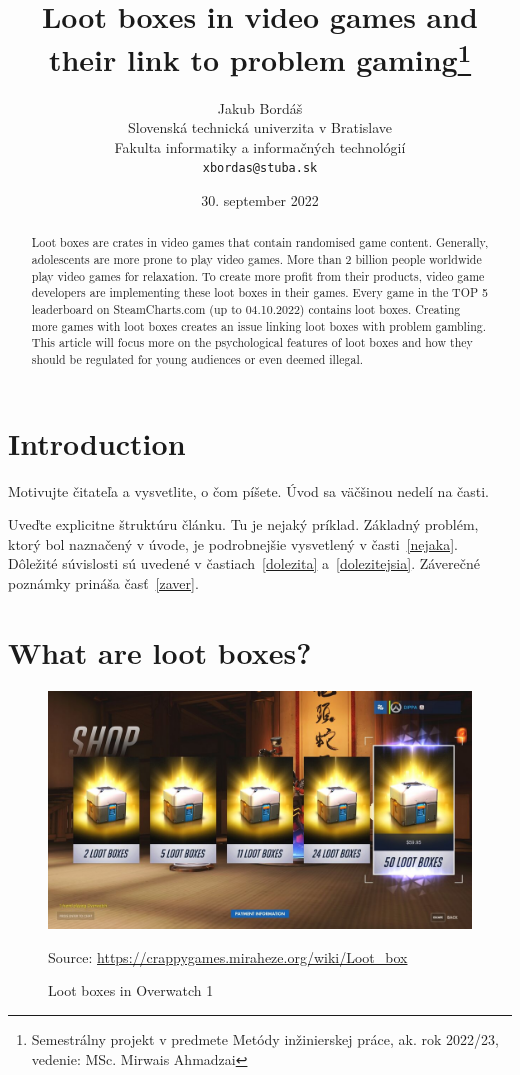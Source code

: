 \documentclass[10pt,twoside,english,a4paper]{coursepaper}
\title{Loot boxes in video games and their link to problem gaming\thanks{Semestrálny projekt v predmete Metódy inžinierskej práce, ak. rok 2022/23, vedenie: MSc. Mirwais Ahmadzai}} %
\author{Jakub Bordáš\\[2pt]
	{\small Slovenská technická univerzita v Bratislave}\\
	{\small Fakulta informatiky a informačných technológií}\\
	{\small \texttt{xbordas@stuba.sk}}
	}
\date{\small 30. september 2022} %
\newcommand{\source}[1]{\caption*{Source: {#1}} }
\begin{document}
\maketitle

\begin{abstract}
Loot boxes are crates in video games that contain randomised game content. Generally, adolescents are more prone to play video games. More than 2 billion people worldwide play video games for relaxation. To create more profit from their products, video game developers are implementing these loot boxes in their games. Every game in the TOP 5 leaderboard on SteamCharts.com (up to 04.10.2022) contains loot boxes. Creating more games with loot boxes creates an issue linking loot boxes with problem gambling. This article will focus more on the psychological features of loot boxes and how they should be regulated for young audiences or even deemed illegal.
\end{abstract}



\section{Introduction}

Motivujte čitateľa a vysvetlite, o čom píšete. Úvod sa väčšinou nedelí na časti.

Uveďte explicitne štruktúru článku. Tu je nejaký príklad.
Základný problém, ktorý bol naznačený v úvode, je podrobnejšie vysvetlený v časti~\ref{nejaka}.
Dôležité súvislosti sú uvedené v častiach~\ref{dolezita} a~\ref{dolezitejsia}.
Záverečné poznámky prináša časť~\ref{zaver}.



\section{What are loot boxes?} \label{sec:what}

\begin{figure}[tbh]
	\centering
	\includegraphics[scale=0.5]{img1}
	\caption{Loot boxes in Overwatch 1}
	\source{\url{https://crappygames.miraheze.org/wiki/Loot_box} }
	\label{fig:img1}
\end{figure}
\end{document}
